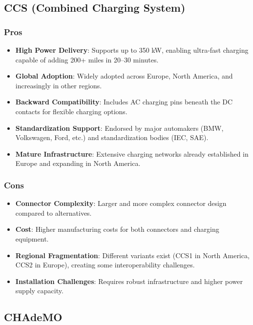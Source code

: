 \documentclass[12pt]{article}
\begin{document}
\subsection{CCS (Combined Charging System)}

\subsubsection{Pros}
\begin{itemize}
    \item \textbf{High Power Delivery}: Supports up to 350 kW, enabling ultra-fast charging capable of adding 200+ miles in 20--30 minutes.
    \item \textbf{Global Adoption}: Widely adopted across Europe, North America, and increasingly in other regions.
    \item \textbf{Backward Compatibility}: Includes AC charging pins beneath the DC contacts for flexible charging options.
    \item \textbf{Standardization Support}: Endorsed by major automakers (BMW, Volkswagen, Ford, etc.) and standardization bodies (IEC, SAE).
    \item \textbf{Mature Infrastructure}: Extensive charging networks already established in Europe and expanding in North America.
\end{itemize}

\subsubsection{Cons}
\begin{itemize}
    \item \textbf{Connector Complexity}: Larger and more complex connector design compared to alternatives.
    \item \textbf{Cost}: Higher manufacturing costs for both connectors and charging equipment.
    \item \textbf{Regional Fragmentation}: Different variants exist (CCS1 in North America, CCS2 in Europe), creating some interoperability challenges.
    \item \textbf{Installation Challenges}: Requires robust infrastructure and higher power supply capacity.
\end{itemize}

\subsection{CHAdeMO}
\end{document}
